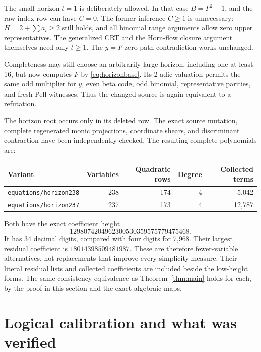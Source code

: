 \documentclass[11pt]{article}
\newcommand{\file}[1]{\nolinkurl{#1}}
\theoremstyle{remark}\newtheorem{remark}[theorem]{Remark}
\begin{document}
The small horizon $t=1$ is deliberately allowed. In that case
$B=F^2+1$, and the raw index row can have $C=0$. The former inference
$C\ge1$ is unnecessary: $H=2+\sum a_i\ge2$ still holds, and all
binomial range arguments allow zero upper representatives. The
generalized CRT and the Horn-flow closure argument themselves need
only $t\ge1$. The $y=F$ zero-path contradiction works unchanged.

Completeness may still choose an arbitrarily large horizon, including
one at least 16, but now computes $F$ by \eqref{eq:horizonbase}.
Its 2-adic valuation permits the same odd multiplier for $y$, even
beta code, odd binomial, representative parities, and fresh Pell
witnesses. Thus the changed source is again equivalent to a refutation.

The horizon root occurs only in its deleted row. The exact source
mutation, complete regenerated monic projections, coordinate shears,
and discriminant contraction have been independently checked. The
resulting complete polynomials are:
\begin{center}\small
\begin{tabular}{lrrrr}
\toprule
Variant & Variables & Quadratic rows & Degree & Collected terms\\
\midrule
\file{equations/horizon238} &238&174&4&5,042\\
\file{equations/horizon237} &237&173&4&12,787\\
\bottomrule
\end{tabular}
\end{center}
Both have the exact coefficient height
\[
 1298074204962300530359575779475468.
\]
It has 34 decimal digits, compared with four digits for 7,968.
Their largest residual coefficient is $18014398509481987$.
These are therefore fewer-variable alternatives, not replacements
that improve every simplicity measure. Their literal residual lists
and collected coefficients are included beside the low-height forms.
The same consistency equivalence as Theorem~\ref{thm:main} holds for
each, by the proof in this section and the exact algebraic maps.

\section{Logical calibration and what was verified}
\end{document}
